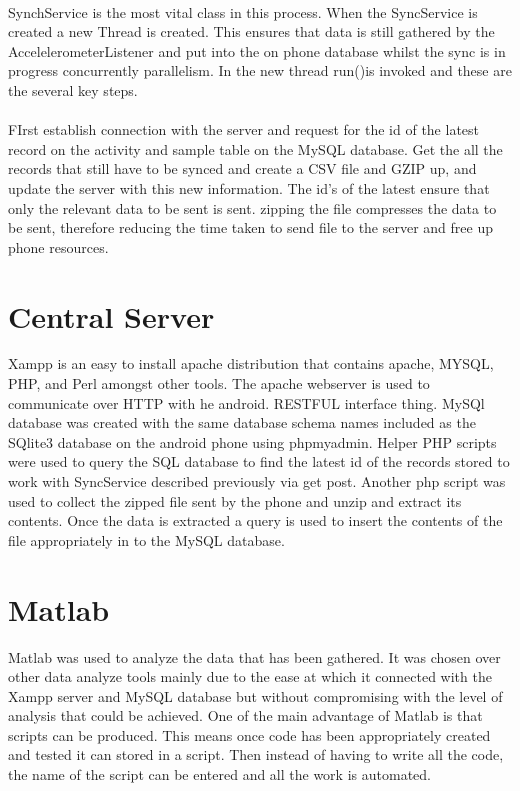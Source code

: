 \paragraph{}
SynchService is the most vital class in this process. When the SyncService is created a new Thread is created. This ensures that data is still gathered by the AccelelerometerListener and put into the on phone database whilst the sync is in progress concurrently parallelism. In the new thread run()is invoked and these are the several key steps. 
\paragraph{}
FIrst establish connection with the server and request for the id of the latest record on the activity and sample table on the MySQL database. Get the all the records that still have to be synced and create a CSV file and GZIP up, and update the server with this new information. The id's of the latest ensure that only the relevant data to be sent is sent. zipping the file compresses the data to be sent, therefore reducing the time taken to send file to the server and free up phone resources. 

\section{Central Server} %
\label{sec:section_server}
Xampp is an easy to install apache distribution that contains apache, MYSQL, PHP, and Perl amongst other tools. The apache webserver is used to communicate over HTTP with he android. RESTFUL interface thing.
MySQl database was created with the same database schema names included as the SQlite3 database on the android phone using phpmyadmin. Helper PHP scripts were used to query the SQL database to find the latest id of the records stored to work with SyncService described previously via get post. Another php script was used to collect the zipped file sent by the phone and unzip and extract its contents. Once the data is extracted a query is used to insert the contents of the file appropriately in to the MySQL database.

\section{Matlab} %
\label{sec:section_matlab}
Matlab was used to analyze the data that has been gathered. It was chosen over other data analyze tools mainly due to the ease at which it connected with the Xampp server and MySQL database but without compromising with the level of analysis that could be achieved. One of the main advantage of Matlab is that scripts can be produced. This means once code has been appropriately created and tested it can stored in a script. Then instead of having to write all the code, the name of the script can be entered and all the work is automated. 
 